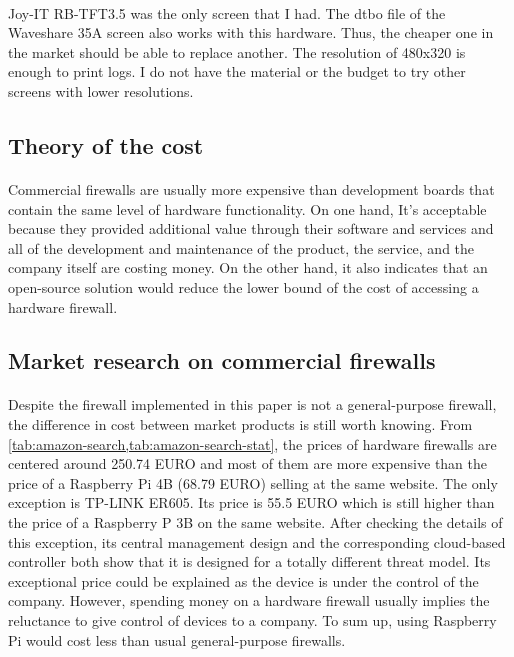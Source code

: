 \documentclass[mscthesis]{usiinfthesis}
\begin{document}
\paragraph{}
Joy-IT RB-TFT3.5 was the only screen that I had. The dtbo file of the Waveshare 35A screen also works with this hardware. Thus, the cheaper one in the market should be able to replace another. The resolution of 480x320 is enough to print logs. I do not have the material or the budget to try other screens with lower resolutions.

\subsection{Theory of the cost}
\paragraph{}
Commercial firewalls are usually more expensive than development boards that contain the same level of hardware functionality. On one hand, It's acceptable because they provided additional value through their software and services and all of the development and maintenance of the product, the service, and the company itself are costing money. On the other hand, it also indicates that an open-source solution would reduce the lower bound of the cost of accessing a hardware firewall.

\subsection{Market research on commercial firewalls}
\paragraph{}
Despite the firewall implemented in this paper is not a general-purpose firewall, the difference in cost between market products is still worth knowing. From \cref{tab:amazon-search,tab:amazon-search-stat}, the prices of hardware firewalls are centered around 250.74 EURO and most of them are more expensive than the price of a Raspberry Pi 4B (68.79 EURO) selling at the same website. The only exception is TP-LINK ER605. Its price is 55.5 EURO which is still higher than the price of a Raspberry P 3B on the same website. After checking the details of this exception, its central management design and the corresponding cloud-based controller both show that it is designed for a totally different threat model. Its exceptional price could be explained as the device is under the control of the company. However, spending money on a hardware firewall usually implies the reluctance to give control of devices to a company. To sum up, using Raspberry Pi would cost less than usual general-purpose firewalls.
\end{document}

